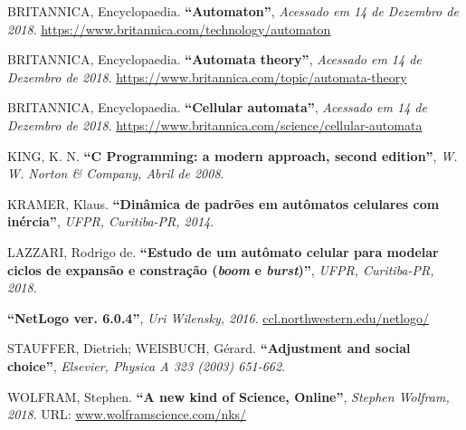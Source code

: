 \documentclass[11pt,a4paper,twocolumn,final]{article}
\begin{document}
\begin{thebibliography}{9}
	
	BRITANNICA, Encyclopaedia.
	\textbf{``Automaton''}, 
	\textit{Acessado em 14 de Dezembro de 2018}.
	\url{https://www.britannica.com/technology/automaton}
	
	BRITANNICA, Encyclopaedia.
	\textbf{``Automata theory''}, 
	\textit{Acessado em 14 de Dezembro de 2018}.
	\url{https://www.britannica.com/topic/automata-theory}
	
	BRITANNICA, Encyclopaedia.
	\textbf{``Cellular automata''}, 
	\textit{Acessado em 14 de Dezembro de 2018}.
	\url{https://www.britannica.com/science/cellular-automata}
	
	KING, K. N.
	\textbf{``C Programming: a modern approach, second edition''}, 
	\textit{ W. W. Norton \& Company, Abril de 2008}.
	
	KRAMER, Klaus.
	\textbf{``Dinâmica de padrões em autômatos celulares com inércia''}, 
	\textit{ UFPR, Curitiba-PR, 2014}.
	
	LAZZARI, Rodrigo de.
	\textbf{``Estudo de um autômato celular para modelar ciclos de expansão e constração (\textit{boom} e \textit{burst})''}, 
	\textit{ UFPR, Curitiba-PR, 2018}.
	
	\textbf{``NetLogo ver. 6.0.4''}, 
	\textit{Uri Wilensky, 2016}.
	\url{ccl.northwestern.edu/netlogo/}

	STAUFFER, Dietrich; WEISBUCH, Gérard.
	\textbf{``Adjustment and social choice''}, 
	\textit{ Elsevier, Physica A 323 (2003) 651-662}.
	
	WOLFRAM, Stephen.
	\textbf{``A new kind of Science, Online''}, 
	\textit{Stephen Wolfram, 2018}. URL: \url{www.wolframscience.com/nks/}
	
\end{thebibliography}
\end{document}
